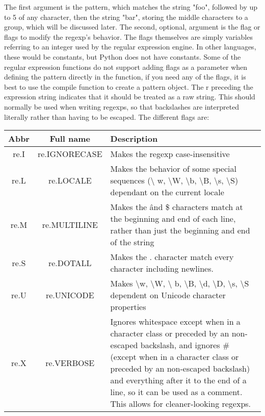 The first argument is the pattern, which matches the string "foo", followed by
up to 5 of any character, then the string "bar", storing the middle characters
to a group, which will be discussed later. The second, optional, argument is the
flag or flags to modify the regexp's behavior. The flags themselves are simply
variables referring to an integer used by the regular expression engine. In
other languages, these would be constants, but Python does not have constants.
Some of the regular expression functions do not support adding flags as a
parameter when defining the pattern directly in the function, if you need any of
the flags, it is best to use the compile function to create a pattern object.
The r preceding the expression string indicates that it should be treated as a
raw string. This should normally be used when writing regexps, so that
backslashes are interpreted literally rather than having to be escaped.
The different flags are:\\
\begin{tabular}{|c|c|p{3.6cm}|}
\hline
Abbr& Full name&	Description\\
\hline
re.I	&re.IGNORECASE&	Makes the regexp case-insensitive\\
\hline
re.L	&re.LOCALE&	Makes the behavior of some special sequences (\textbackslash
w, \textbackslash W, \textbackslash b,
\textbackslash B, \textbackslash s, \textbackslash S) dependant on the current locale\\
\hline
re.M	&re.MULTILINE	&Makes the \^ and \$ characters match at the beginning and
end of each line, rather than just the beginning and end of the string\\
\hline
re.S	&re.DOTALL&	Makes the . character match every character including
newlines.\\
\hline
re.U	&re.UNICODE&	Makes \textbackslash w, \textbackslash W, \textbackslash
b, \textbackslash B, \textbackslash d, \textbackslash D, \textbackslash s,
\textbackslash S dependent on
Unicode character properties\\
\hline
re.X	&re.VERBOSE&	Ignores whitespace except when in a character class or
preceded by an non-escaped backslash, and ignores \# (except when in a character
class or preceded by an non-escaped backslash) and everything after it to the
end of a line, so it can be used as a comment. This allows for cleaner-looking
regexps.\\
\hline
\end{tabular}

